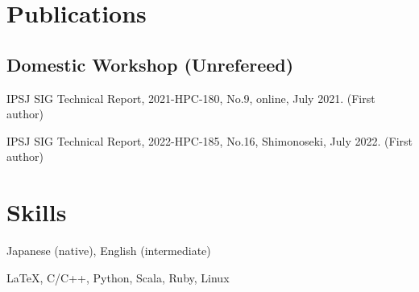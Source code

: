 \documentclass[10pt]{article}
\begin{document}
\section{Publications}
\subsection{Domestic Workshop (Unrefereed)}
\begin{description}[align=left,leftmargin=0.5cm,style=multiline]
  \item[1.] IPSJ SIG Technical Report, 2021-HPC-180, No.9, online, July 2021. (First author)
  \item[2.] IPSJ SIG Technical Report, 2022-HPC-185, No.16, Shimonoseki, July 2022. (First author)
\end{description}


\section{Skills}
\begin{description}[align=left,leftmargin=2.5cm,style=multiline]
  \setlength{\itemsep}{0pt}
  \item [Languages] Japanese (native), English (intermediate)
  \item [Coding] \LaTeX, C/C++, Python, Scala, Ruby, Linux
\end{description}
\end{document}
